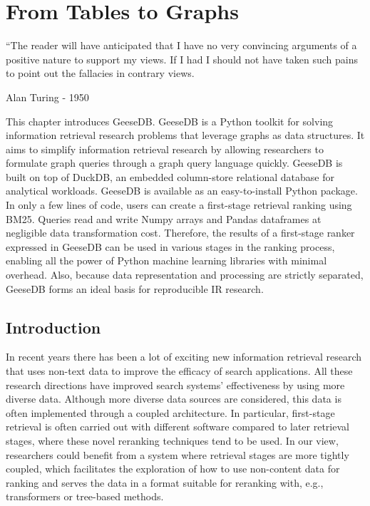 \chapter{From Tables to Graphs}
\label{from-tables-to-graphs}
\epigraph{``The reader will have anticipated that I have no very convincing
	arguments of a positive nature to support my views. If I had I should not
	have taken such pains to point out the fallacies in contrary views.}{Alan Turing - 1950}

\begin{Abstract}
	\begin{changemargin}{1cm}{1cm}
		This chapter introduces GeeseDB. GeeseDB is a Python toolkit for solving information retrieval research problems that leverage graphs as data structures. It aims to simplify information retrieval research by allowing researchers to formulate graph queries through a graph query language quickly. GeeseDB is built on top of DuckDB, an embedded column-store relational database for analytical workloads. GeeseDB is available as an easy-to-install Python package. In only a few lines of code, users can create a first-stage retrieval ranking using BM25. Queries read and write Numpy arrays and Pandas dataframes at negligible data transformation cost. Therefore, the results of a first-stage ranker expressed in GeeseDB can be used	in various stages in the ranking process, enabling all the power of Python machine learning libraries with minimal overhead. Also, because data representation and processing are strictly separated, GeeseDB forms an ideal basis for reproducible IR research.
	\end{changemargin}
\end{Abstract}

\section{Introduction}
In recent years there has been a lot of exciting new information retrieval research that uses non-text data to improve the efficacy of search applications. All these research directions have improved search systems' effectiveness by using more diverse data. Although more diverse data sources are considered, this data is often implemented through a coupled architecture. In particular, first-stage retrieval is often carried out with different software compared to later retrieval stages, where these novel reranking techniques tend to be used. In our view, researchers could benefit from a system where retrieval stages are more tightly coupled, which facilitates the exploration of how to use non-content data for ranking and serves the data in a format suitable for reranking with, e.g., transformers or tree-based methods.

